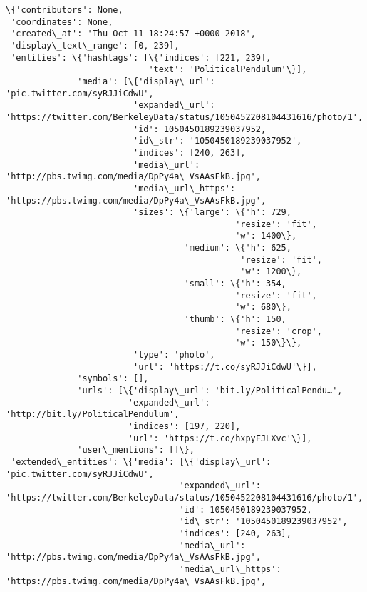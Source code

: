 \documentclass[11pt]{article}
\begin{document}
    \begin{Verbatim}[commandchars=\\\{\}]
\{'contributors': None,
 'coordinates': None,
 'created\_at': 'Thu Oct 11 18:24:57 +0000 2018',
 'display\_text\_range': [0, 239],
 'entities': \{'hashtags': [\{'indices': [221, 239],
                            'text': 'PoliticalPendulum'\}],
              'media': [\{'display\_url': 'pic.twitter.com/syRJJiCdwU',
                         'expanded\_url': 'https://twitter.com/BerkeleyData/status/1050452208104431616/photo/1',
                         'id': 1050450189239037952,
                         'id\_str': '1050450189239037952',
                         'indices': [240, 263],
                         'media\_url': 'http://pbs.twimg.com/media/DpPy4a\_VsAAsFkB.jpg',
                         'media\_url\_https': 'https://pbs.twimg.com/media/DpPy4a\_VsAAsFkB.jpg',
                         'sizes': \{'large': \{'h': 729,
                                             'resize': 'fit',
                                             'w': 1400\},
                                   'medium': \{'h': 625,
                                              'resize': 'fit',
                                              'w': 1200\},
                                   'small': \{'h': 354,
                                             'resize': 'fit',
                                             'w': 680\},
                                   'thumb': \{'h': 150,
                                             'resize': 'crop',
                                             'w': 150\}\},
                         'type': 'photo',
                         'url': 'https://t.co/syRJJiCdwU'\}],
              'symbols': [],
              'urls': [\{'display\_url': 'bit.ly/PoliticalPendu…',
                        'expanded\_url': 'http://bit.ly/PoliticalPendulum',
                        'indices': [197, 220],
                        'url': 'https://t.co/hxpyFJLXvc'\}],
              'user\_mentions': []\},
 'extended\_entities': \{'media': [\{'display\_url': 'pic.twitter.com/syRJJiCdwU',
                                  'expanded\_url': 'https://twitter.com/BerkeleyData/status/1050452208104431616/photo/1',
                                  'id': 1050450189239037952,
                                  'id\_str': '1050450189239037952',
                                  'indices': [240, 263],
                                  'media\_url': 'http://pbs.twimg.com/media/DpPy4a\_VsAAsFkB.jpg',
                                  'media\_url\_https': 'https://pbs.twimg.com/media/DpPy4a\_VsAAsFkB.jpg',

\end{Verbatim}
\end{document}
